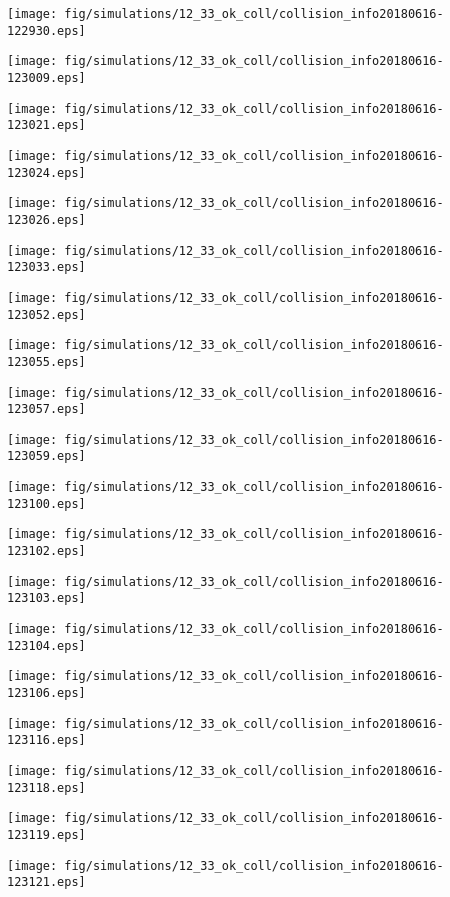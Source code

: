 \texttt{[image: fig/simulations/12\_33\_ok\_coll/collision\_info20180616-122930.eps]}

\texttt{[image: fig/simulations/12\_33\_ok\_coll/collision\_info20180616-123009.eps]}

\texttt{[image: fig/simulations/12\_33\_ok\_coll/collision\_info20180616-123021.eps]}

\texttt{[image: fig/simulations/12\_33\_ok\_coll/collision\_info20180616-123024.eps]}

\texttt{[image: fig/simulations/12\_33\_ok\_coll/collision\_info20180616-123026.eps]}

\texttt{[image: fig/simulations/12\_33\_ok\_coll/collision\_info20180616-123033.eps]}

\texttt{[image: fig/simulations/12\_33\_ok\_coll/collision\_info20180616-123052.eps]}

\texttt{[image: fig/simulations/12\_33\_ok\_coll/collision\_info20180616-123055.eps]}

\texttt{[image: fig/simulations/12\_33\_ok\_coll/collision\_info20180616-123057.eps]}

\texttt{[image: fig/simulations/12\_33\_ok\_coll/collision\_info20180616-123059.eps]}

\texttt{[image: fig/simulations/12\_33\_ok\_coll/collision\_info20180616-123100.eps]}

\texttt{[image: fig/simulations/12\_33\_ok\_coll/collision\_info20180616-123102.eps]}

\texttt{[image: fig/simulations/12\_33\_ok\_coll/collision\_info20180616-123103.eps]}

\texttt{[image: fig/simulations/12\_33\_ok\_coll/collision\_info20180616-123104.eps]}

\texttt{[image: fig/simulations/12\_33\_ok\_coll/collision\_info20180616-123106.eps]}

\texttt{[image: fig/simulations/12\_33\_ok\_coll/collision\_info20180616-123116.eps]}

\texttt{[image: fig/simulations/12\_33\_ok\_coll/collision\_info20180616-123118.eps]}

\texttt{[image: fig/simulations/12\_33\_ok\_coll/collision\_info20180616-123119.eps]}

\texttt{[image: fig/simulations/12\_33\_ok\_coll/collision\_info20180616-123121.eps]}

